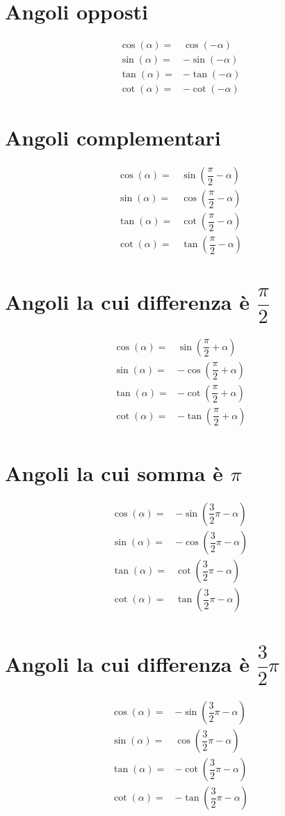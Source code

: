 \section{Angoli opposti}
\begin{align*}
\cos(\alpha)=&\cos(-\alpha)\\
\sin(\alpha)=&-\sin(-\alpha)\\
\tan(\alpha)=&-\tan(-\alpha)\\
\cot(\alpha)=&-\cot(-\alpha)
\end{align*}
\section{Angoli complementari}
\begin{align*}
\cos(\alpha)=&\sin(\dfrac{\pi}{2}-\alpha)\\
\sin(\alpha)=&\cos(\dfrac{\pi}{2}-\alpha)\\
\tan(\alpha)=&\cot(\dfrac{\pi}{2}-\alpha)\\
\cot(\alpha)=&\tan(\dfrac{\pi}{2}-\alpha)\\
\end{align*}
\section{Angoli la cui differenza è \texorpdfstring{$\dfrac{\pi}{2}$}{\textpi/2} }
\begin{align*}
\cos(\alpha)=&\sin(\dfrac{\pi}{2}+\alpha)\\
\sin(\alpha)=&-\cos(\dfrac{\pi}{2}+\alpha)\\
\tan(\alpha)=&-\cot(\dfrac{\pi}{2}+\alpha)\\
\cot(\alpha)=&-\tan(\dfrac{\pi}{2}+\alpha)\\
\end{align*}
\section{Angoli la cui somma è \texorpdfstring{$\pi$}{\textpi}}
\begin{align*}
\cos(\alpha)=&-\sin(\dfrac{3}{2}\pi-\alpha)\\
\sin(\alpha)=&-\cos(\dfrac{3}{2}\pi-\alpha)\\
\tan(\alpha)=&\cot(\dfrac{3}{2}\pi-\alpha)\\
\cot(\alpha)=&\tan(\dfrac{3}{2}\pi-\alpha)\\
\end{align*}
\section{Angoli la cui differenza è \texorpdfstring{$\dfrac{3}{2}\pi$}{3/2 \textpi}}
\begin{align*} 
\cos(\alpha)=&-\sin(\dfrac{3}{2}\pi-\alpha)\\
\sin(\alpha)=&\cos(\dfrac{3}{2}\pi-\alpha)\\
\tan(\alpha)=&-\cot(\dfrac{3}{2}\pi-\alpha)\\
\cot(\alpha)=&-\tan(\dfrac{3}{2}\pi-\alpha)\\
\end{align*}
